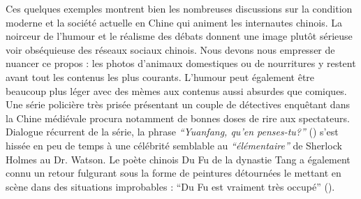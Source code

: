 Ces quelques exemples montrent bien les nombreuses discussions sur la condition moderne et la société actuelle en Chine qui animent les internautes chinois. La noirceur de l'humour et le réalisme des débats donnent une image plutôt sérieuse voir obséquieuse des réseaux sociaux chinois. Nous devons nous empresser de nuancer ce propos : les photos d'animaux domestiques ou de nourritures y restent avant tout les contenus les plus courants. L'humour peut également être beaucoup plus léger avec des mèmes aux contenus aussi absurdes que comiques. Une série policière très prisée présentant un couple de détectives enquêtant dans la Chine médiévale procura notamment de bonnes doses de rire aux spectateurs. Dialogue récurrent de la série, la phrase \textit{``Yuanfang, qu'en penses-tu?''} () s'est hissée en peu de temps à une célébrité semblable au \textit{``élémentaire''} de Sherlock Holmes au Dr. Watson. Le poète chinois Du Fu de la dynastie Tang a également connu un retour fulgurant sous la forme de peintures détournées le mettant en scène dans des situations improbables : ``Du Fu est vraiment très occupé'' (). 


